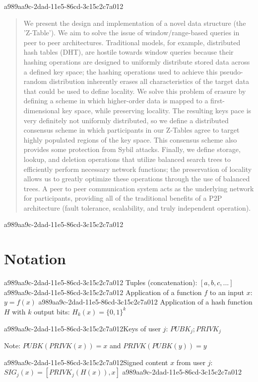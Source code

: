 \documentclass[12pt]{article}
\begin{document}
\maketitle
a989aa9c-2dad-11e5-86cd-3c15c2c7a012
\begin{abstract}
We present the design and implementation of a novel data structure (the 'Z-Table'). We aim to solve the issue of window/range-based queries in peer to peer architectures. Traditional models, for example,  distributed hash tables (DHT), are hostile towards window queries because their hashing operations are designed to uniformly distribute stored data across a defined key space; the hashing operations used to achieve this pseudo-random distribution inherently erases all characteristics of the target data that could be used to define locality. We solve this problem of erasure by defining a scheme in which higher-order data is mapped to a first-dimensional key space, while preserving locality. The resulting keys pace is very definitely not uniformly distributed, so we define a distributed consensus scheme in which participants in our Z-Tables agree to target highly populated regions of the key space. This consensus scheme also provides some protection from Sybil attacks. Finally, we define storage, lookup, and deletion operations that utilize balanced search trees to efficiently perform necessary network functions; the preservation of locality allows us to greatly optimize these operations through the use of balanced trees. A peer to peer communication system acts as the underlying network for participants, providing all of the traditional benefits of a P2P architecture (fault tolerance, scalability, and truly independent operation).
\end{abstract}
a989aa9c-2dad-11e5-86cd-3c15c2c7a012
\section{Notation}
a989aa9c-2dad-11e5-86cd-3c15c2c7a012
Tuples (concatenation): $[a,b,c,...]$
a989aa9c-2dad-11e5-86cd-3c15c2c7a012
Application of a function $f$ to an input $x$: $y=f(x)$
a989aa9c-2dad-11e5-86cd-3c15c2c7a012
Application of a hash function $H$ with $k$ output bits: $H_{k}(x) = \{0,1\}^k$

a989aa9c-2dad-11e5-86cd-3c15c2c7a012Keys of user $j$: $ PUBK_j; PRIVK_j $

Note: $PUBK(PRIVK(x)) = x$ and $PRIVK(PUBK(y)) = y$~

a989aa9c-2dad-11e5-86cd-3c15c2c7a012Signed content $x$ from user $j$: $SIG_j(x) = \left[ PRIVK_j( H(x) ), x \right]$
a989aa9c-2dad-11e5-86cd-3c15c2c7a012
\end{document}
